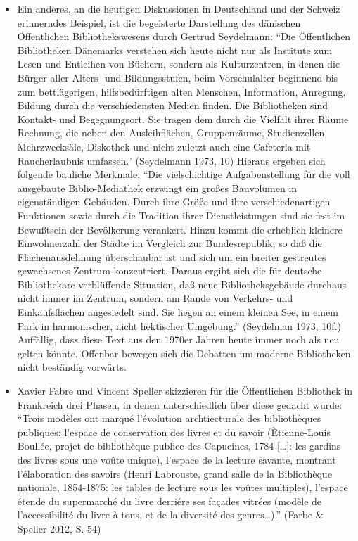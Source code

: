 \documentclass[a4paper,
fontsize=11pt,
oneside,
numbers=noperiodatend,
parskip=half-,
bibliography=totoc,
final
]{scrartcl}
\begin{document}
\begin{itemize}
{  komfortabler Räume nach neuen technischen und ästhetischen
  Gesichtspunkten ist eine überall anzutreffende Erscheinung.} (Paščenko
  \& Schwarz 1986, S. 12) Diese Verschiebung im Diskurs lässt sich mit
  den Veränderungen im politischen System der Sowjetunion erklären. Die
  politischen Veränderungen einer Zeit schlagen sich offenbar auch in
  der Sicht auf die Bibliothek nieder.
\item
  Ein anderes, an die heutigen Diskussionen in Deutschland und der
  Schweiz erinnerndes Beispiel, ist die begeisterte Darstellung des
  dänischen Öffentlichen Bibliothekswesens durch Gertrud Seydelmann:
  \enquote{Die Öffentlichen Bibliotheken Dänemarks verstehen sich heute
  nicht nur als Institute zum Lesen und Entleihen von Büchern, sondern
  als Kulturzentren, in denen die Bürger aller Alters- und
  Bildungsstufen, beim Vorschulalter beginnend bis zum bettlägerigen,
  hilfsbedürftigen alten Menschen, Information, Anregung, Bildung durch
  die verschiedensten Medien finden. Die Bibliotheken sind Kontakt- und
  Begegnungsort. Sie tragen dem durch die Vielfalt ihrer Räume Rechnung,
  die neben den Ausleihflächen, Gruppenräume, Studienzellen,
  Mehrzwecksäle, Diskothek und nicht zuletzt auch eine Cafeteria mit
  Raucherlaubnis umfassen.} (Seydelmann 1973, 10) Hieraus ergeben sich
  folgende bauliche Merkmale: \enquote{Die vielschichtige
  Aufgabenstellung für die voll ausgebaute Biblio-Mediathek erzwingt ein
  großes Bauvolumen in eigenständigen Gebäuden. Durch ihre Größe und
  ihre verschiedenartigen Funktionen sowie durch die Tradition ihrer
  Dienstleistungen sind sie fest im Bewußtsein der Bevölkerung
  verankert. Hinzu kommt die erheblich kleinere Einwohnerzahl der Städte
  im Vergleich zur Bundesrepublik, so daß die Flächenausdehnung
  überschaubar ist und sich um ein breiter gestreutes gewachsenes
  Zentrum konzentriert. Daraus ergibt sich die für deutsche
  Bibliothekare verblüffende Situation, daß neue Bibliotheksgebäude
  durchaus nicht immer im Zentrum, sondern am Rande von Verkehrs- und
  Einkaufsflächen angesiedelt sind. Sie liegen an einem kleinen See, in
  einem Park in harmonischer, nicht hektischer Umgebung.} (Seydelman
  1973, 10f.) Auffällig, dass diese Text aus den 1970er Jahren heute
  immer noch als neu gelten könnte. Offenbar bewegen sich die Debatten
  um moderne Bibliotheken nicht beständig vorwärts.
\item
  Xavier Fabre und Vincent Speller skizzieren für die Öffentlichen
  Bibliothek in Frankreich drei Phasen, in denen unterschiedlich über
  diese gedacht wurde: \enquote{Trois modèles ont marqué l'évolution
  archtiecturale des bibliothèques publiques: l'espace de conservation
  des livres et du savoir (Ètienne-Louis Boullée, projet de bibliothèque
  publice des Capucines, 1784 {[}\ldots{}{]}: les gardins des livres
  sous une voûte unique), l'espace de la lecture savante, montrant
  l'élaboration des savoirs (Henri Labrouste, grand salle de la
  Bibliothèque nationale, 1854-1875: les tables de lecture sous les
  voûtes multiples), l'espace étende du supermarché du livre derriére
  ses façades vitrées (modèle de l'accessibilité du livre à tous, et de
  la diversité des genres\ldots{}).} (Farbe \& Speller 2012, S. 54)
\end{itemize}
\end{document}
